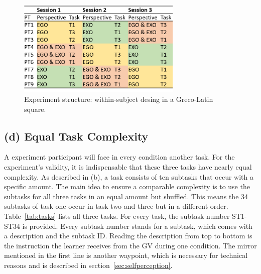 \begin{figure}[htb]
	\centering
	\includegraphics[width=0.7\textwidth]{figures/study_session_plan.png}
	\caption[Experiment structure]{Experiment structure: within-subject desing in a Greco-Latin square.}
	\label{fig:study_session_plan}
\end{figure}

\subsection{(d) Equal Task Complexity}
A experiment participant will face in every condition another task. For the experiment's validity, it is indispensable that these three tasks have nearly equal complexity. As described in (b), a task consists of ten subtasks that occur with a specific amount. The main idea to ensure a comparable complexity is to use the subtasks for all three tasks in an equal amount but shuffled. This means the 34 subtasks of task one occur in task two and three but in a different order. Table~\ref{tab:tasks} lists all three tasks. For every task, the subtask number ST1-ST34 is provided. Every subtask number stands for a subtask, which comes with a description and the subtask ID. Reading the description from top to bottom is the instruction the learner receives from the GV during one condition. The mirror mentioned in the first line is another waypoint, which is necessary for technical reasons and is described in section~\ref{sec:selfperception}.

